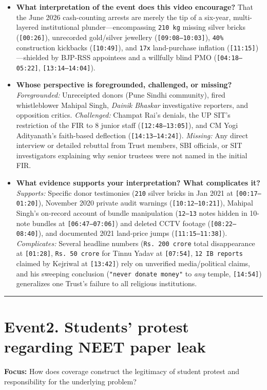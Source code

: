 \documentclass[10pt,a4paper]{article}
\begin{document}
\begin{itemize}[leftmargin=1.5em, itemsep=3pt, topsep=4pt]
  \item \textbf{What interpretation of the event does this video encourage?} That the June 2026 cash-counting arrests are merely the tip of a six-year, multi-layered institutional plunder---encompassing \texttt{210 kg} missing silver bricks (\texttt{[00:26]}), unrecorded gold/silver jewellery (\texttt{[09:08--10:03]}), \texttt{40\%} construction kickbacks (\texttt{[10:49]}), and \texttt{17x} land-purchase inflation (\texttt{[11:15]})---shielded by BJP-RSS appointees and a willfully blind PMO (\texttt{[04:18--05:22]}, \texttt{[13:14--14:04]}).
  \item \textbf{Whose perspective is foregrounded, challenged, or missing?} \textit{Foregrounded:} Unreceipted donors (Pune Sindhi community), fired whistleblower Mahipal Singh, \textit{Dainik Bhaskar} investigative reporters, and opposition critics. \textit{Challenged:} Champat Rai's denials, the UP SIT's restriction of the FIR to 8 junior staff (\texttt{[12:48--13:05]}), and CM Yogi Adityanath's faith-based deflection (\texttt{[14:13--14:24]}). \textit{Missing:} Any direct interview or detailed rebuttal from Trust members, SBI officials, or SIT investigators explaining why senior trustees were not named in the initial FIR.
  \item \textbf{What evidence supports your interpretation? What complicates it?} \textit{Supports:} Specific donor testimonies (\texttt{210} silver bricks in Jan 2021 at \texttt{[00:17--01:20]}), November 2020 private audit warnings (\texttt{[10:12--10:21]}), Mahipal Singh's on-record account of bundle manipulation (\texttt{12--13} notes hidden in 10-note bundles at \texttt{[06:47--07:06]}) and deleted CCTV footage (\texttt{[08:22--08:40]}), and documented 2021 land-price jumps (\texttt{[11:15--11:38]}). \textit{Complicates:} Several headline numbers (\texttt{Rs.\,200 crore} total disappearance at \texttt{[01:28]}, \texttt{Rs.\,50 crore} for Tinnu Yadav at \texttt{[07:54]}, \texttt{12 IB reports} claimed by Kejriwal at \texttt{[13:42]}) rely on unverified media/political claims, and his sweeping conclusion (\texttt{"never donate money"} to \textit{any} temple, \texttt{[14:54]}) generalizes one Trust's failure to all religious institutions.
\end{itemize}
\vspace{4pt}\noindent\rule{\textwidth}{0.4pt}\vspace{4pt}

\section*{Event2. Students' protest regarding NEET paper leak}
\textbf{Focus:} How does coverage construct the legitimacy of student protest and responsibility for the underlying problem?
\end{document}
